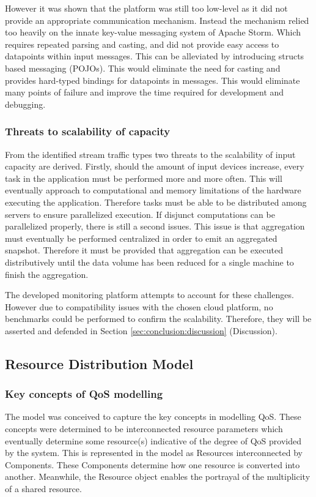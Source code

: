 However it was shown that the platform was still too low-level as it did not provide an appropriate communication mechanism. Instead the mechanism relied too heavily on the innate key-value messaging system of Apache Storm. Which requires repeated parsing and casting, and did not provide easy access to datapoints within input messages. This can be alleviated by introducing structs based messaging (POJOs). This would eliminate the need for casting and provides hard-typed bindings for datapoints in messages. This would eliminate many points of failure and improve the time required for development and debugging.

\subsubsection{Threats to scalability of capacity}
From the identified stream traffic types two threats to the scalability of input capacity are derived. Firstly, should the amount of input devices increase, every task in the application must be performed more and more often. This will eventually approach to computational and memory limitations of the hardware executing the application. Therefore tasks must be able to be distributed among servers to ensure parallelized execution. If disjunct computations can be parallelized properly, there is still a second issues. This issue is that aggregation must eventually be performed centralized in order to emit an aggregated snapshot. Therefore it must be provided that aggregation can be executed distributively until the data volume has been reduced for a single machine to finish the aggregation.

The developed monitoring platform attempts to account for these challenges. However due to compatibility issues with the chosen cloud platform, no benchmarks could be performed to confirm the scalability. Therefore, they will be asserted and defended in Section \ref{sec:conclusion:discussion} (Discussion).



\subsection{Resource Distribution Model}
\subsubsection{Key concepts of QoS modelling}
The model was conceived to capture the key concepts in modelling QoS. These concepts were determined to be interconnected resource parameters which eventually determine some resource(s) indicative of the degree of QoS provided by the system. This is represented in the model as Resources interconnected by Components. These Components determine how one resource is converted into another. Meanwhile, the Resource object enables the portrayal of the multiplicity of a shared resource. 

